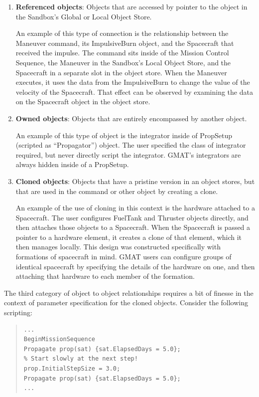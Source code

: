 \documentclass[10pt,letterpaper]{article}
\begin{document}
\begin{enumerate}
\item \textbf{Referenced objects}: Objects that are accessed by pointer to the object in the Sandbox's  Global or Local Object Store.  

An example of this type of connection is the relationship between the Maneuver command, its ImpulsiveBurn object, and the Spacecraft that received the impulse.  The command sits inside of the Mission Control Sequence, the Maneuver in the Sandbox's Local Object Store, and the Spacecraft in a separate slot in the object store.  When the Maneuver executes, it uses the data from the ImpulsiveBurn to change the value of the velocity of the Spacecraft.  That effect can be observed by examining the data on the Spacecraft object in the object store.
\item \textbf{Owned objects}: Objects that are entirely encompassed by another object. 

An example of this type of object is the integrator inside of PropSetup (scripted as ``Propagator'') object.  The user specified the class of integrator required, but never directly script the integrator.  GMAT's integrators are always hidden inside of a PropSetup.
\item \textbf{Cloned objects}: Objects that have a pristine version in an object stores, but that are used in the command or other object by creating a clone.  

An example of the use of cloning in this context is the hardware attached to a Spacecraft.  The user configures FuelTank and Thruster objects directly, and then attaches those objects to a Spacecraft.  When the Spacecraft is passed a pointer to a hardware element, it creates a clone of that element, which it then manages locally.  This design was constructed specifically with formations of spacecraft in mind.  GMAT users can configure groups of identical spacecraft by specifying the details of the hardware on one, and then attaching that hardware to each member of the formation. 
\end{enumerate}

The third category of object to object relationships requires a bit of finesse in the context of parameter specification for the cloned objects.  Consider the following scripting:
\begin{quote}
\begin{verbatim}
...
BeginMissionSequence
Propagate prop(sat) {sat.ElapsedDays = 5.0};
% Start slowly at the next step!
prop.InitialStepSize = 3.0;
Propagate prop(sat) {sat.ElapsedDays = 5.0};
...
\end{verbatim}
\end{quote}
\end{document}
